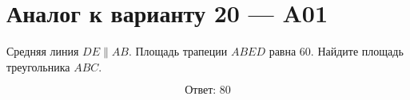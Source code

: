 


\section*{Аналог к варианту 20 — A01}
Средняя линия \(DE\parallel AB\). Площадь трапеции \(ABED\) равна \(60\). Найдите площадь треугольника \(ABC\).
\begin{center}\figMidlineTriangle\end{center}
\[\boxed{\text{Ответ: }80}\]

